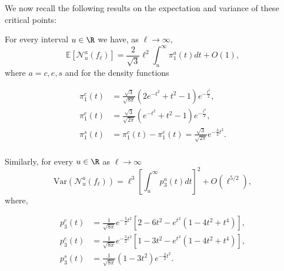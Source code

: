 \documentclass[aps,prd,showpacs,superscriptaddress,groupedaddress]{revtex4-1}  %
\begin{document}

We now recall the following results on the expectation and variance of these critical points:


For every interval $u \in \R$ we have, as $\ell \rightarrow \infty$,
\begin{equation*}
\mathbb{E}[\mathcal{N}_{u}^{a}(f_{\ell })] =\frac{2}{\sqrt{3}} \ell^2 \int_{u}^{\infty}\pi _{1}^{a}(t)dt+O(1),
\end{equation*}
where $a=c,e,s$ and for the density
functions

\begin{align}  
  \pi _{1}^{c}(t)&=\frac{\sqrt{3}}{\sqrt{8\pi
                   }}(2e^{-t^{2}}+t^{2}-1)e^{-\frac{                   
                   t^{2}}{2}}, \\
  \pi _{1}^{e}(t)&=\frac{\sqrt{3}}{\sqrt{2\pi
                   }}(e^{-t^{2}}+t^{2}-1)e^{-\frac{                   
                   t^{2}}{2}},\\
  \pi _{1}^{s}(t)&=\pi _{1}^{c}(t)-\pi
                   _{1}^{e}(t)=\frac{\sqrt{3}}{\sqrt{2\pi
                   }}e^{-\frac{3}{2}t^{2}}.\\
  \label{eqn:exp_crit}                                  
\end{align}



Similarly, for every $u \in \R$ as $\ell \rightarrow \infty $
\begin{equation*}
{\text{Var}}(\mathcal{N}_{u}^{a}(f_{\ell }))=\ell^3 \left[
\int_{u}^{\infty}p_{3}^{a}(t)dt\right] ^{2}+O(\ell ^{5/2}),
\end{equation*}
where,

\begin{align*}
  p_{3}^{c}(t)&=\frac{1}{ \sqrt{8 \pi }}e^{-\frac{3}{2} t^{2}
                }[2-6t^{2}-e^{t^{2}}(1-4t^{2}+t^{4})], \\
  p_{3}^{e}(t)&=\frac{1}{ \sqrt{8 \pi }}e^{-\frac{3}{2} t^{2}
                }[1-3t^{2}-e^{t^{2}}(1-4t^{2}+t^{4})],\\
  p_{3}^{s}(t)&=\frac{1}{ \sqrt{8 \pi }}(1-3t^{2})e^{-\frac{3}{2}%
                t^{2}}. \\
  \label{eqn:var_crit}
\end{align*}
\end{document}
